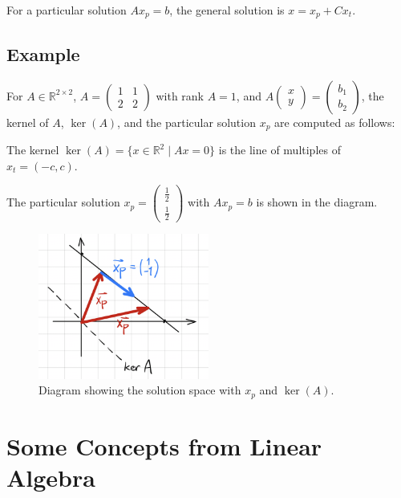 \documentclass[11pt]{article}
\begin{document}
For a particular solution \( A x_p = b \), the general solution is \( x = x_p + C x_t \).

\subsection*{Example}
For \( A \in \mathbb{R}^{2 \times 2} \), \( A = \begin{pmatrix} 1 & 1 \\ 2 & 2 \end{pmatrix} \) with rank \( A = 1 \), and \( A \begin{pmatrix} x \\ y \end{pmatrix} = \begin{pmatrix} b_1 \\ b_2 \end{pmatrix} \), the kernel of \( A \), \( \ker(A) \), and the particular solution \( x_p \) are computed as follows:

The kernel \( \ker(A) = \{ x \in \mathbb{R}^2 \mid Ax = 0 \} \) is the line of multiples of \( x_t = (-c, c) \).

The particular solution \( x_p = \begin{pmatrix} \frac{1}{2} \\ \frac{1}{2} \end{pmatrix} \) with \( A x_p = b \) is shown in the diagram.

\begin{figure}[h!]
\centering
\includegraphics[width=0.5\textwidth]{solution_space.png}
\caption{Diagram showing the solution space with \( x_p \) and \( \ker(A) \).}
\end{figure}



\section*{Some Concepts from Linear Algebra}
\end{document}
